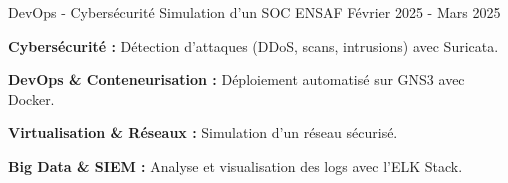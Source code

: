\begin{cventries}
  \cventry
  {DevOps - Cybersécurité}
  {Simulation d’un SOC} %
  {ENSAF} %
  {Février 2025 - Mars 2025} %
  {
    \begin{cvitems} %
      \item {
                  \textbf{Cybersécurité :}
                  Détection d’attaques (DDoS, scans, intrusions) avec Suricata.}
      \item {
                  \textbf{DevOps \& Conteneurisation :}
                  Déploiement automatisé sur GNS3 avec Docker.}
      \item {
                  \textbf{Virtualisation \& Réseaux :}
                  Simulation d’un réseau sécurisé.}
      \item {
                  \textbf{Big Data \& SIEM :}
                  Analyse et visualisation des logs avec l’ELK Stack.}
    \end{cvitems}
  }

\end{cventries}
